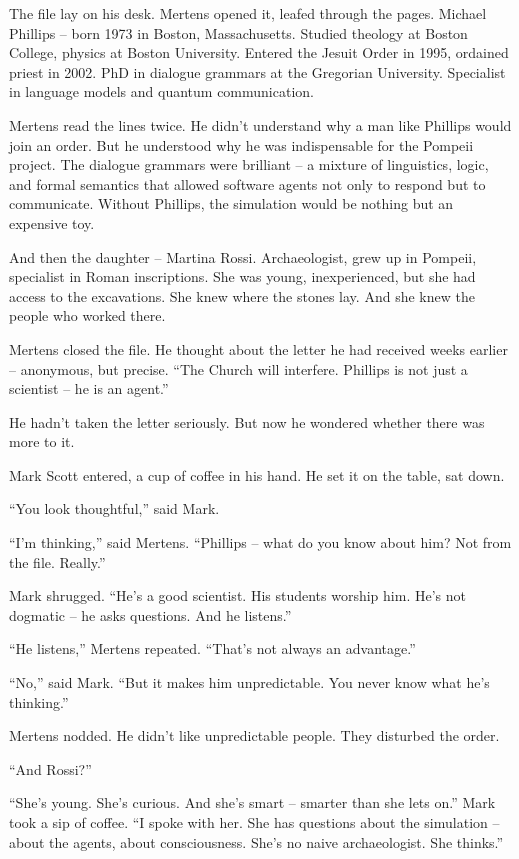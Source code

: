 \documentclass[
]{article}
\begin{document}
The file lay on his desk. Mertens opened it, leafed through the pages. Michael Phillips -- born 1973 in Boston, Massachusetts. Studied theology at Boston College, physics at Boston University. Entered the Jesuit Order in 1995, ordained priest in 2002. PhD in dialogue grammars at the Gregorian University. Specialist in language models and quantum communication.

Mertens read the lines twice. He didn't understand why a man like Phillips would join an order. But he understood why he was indispensable for the Pompeii project. The dialogue grammars were brilliant -- a mixture of linguistics, logic, and formal semantics that allowed software agents not only to respond but to communicate. Without Phillips, the simulation would be nothing but an expensive toy.

And then the daughter -- Martina Rossi. Archaeologist, grew up in Pompeii, specialist in Roman inscriptions. She was young, inexperienced, but she had access to the excavations. She knew where the stones lay. And she knew the people who worked there.

Mertens closed the file. He thought about the letter he had received weeks earlier -- anonymous, but precise. \enquote{The Church will interfere. Phillips is not just a scientist -- he is an agent.}

He hadn't taken the letter seriously. But now he wondered whether there was more to it.

Mark Scott entered, a cup of coffee in his hand. He set it on the table, sat down.

\enquote{You look thoughtful,} said Mark.

\enquote{I'm thinking,} said Mertens. \enquote{Phillips -- what do you know about him? Not from the file. Really.}

Mark shrugged. \enquote{He's a good scientist. His students worship him. He's not dogmatic -- he asks questions. And he listens.}

\enquote{He listens,} Mertens repeated. \enquote{That's not always an advantage.}

\enquote{No,} said Mark. \enquote{But it makes him unpredictable. You never know what he's thinking.}

Mertens nodded. He didn't like unpredictable people. They disturbed the order.

\enquote{And Rossi?}

\enquote{She's young. She's curious. And she's smart -- smarter than she lets on.} Mark took a sip of coffee. \enquote{I spoke with her. She has questions about the simulation -- about the agents, about consciousness. She's no naive archaeologist. She thinks.}
\end{document}
